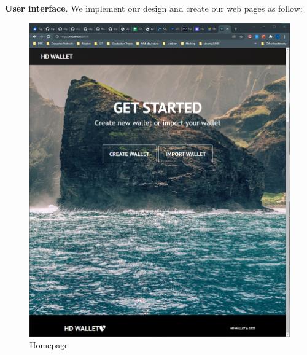 \bigskip
{\textbf{User interface}}. We implement our design and create our web pages as follow:

\begin{figure}[h!]
    \centering
    \includegraphics[width=1\textwidth]{images/homepage.png}
    \caption[Homepage]{Homepage}
    \label{fig:homepage}
  \end{figure}


